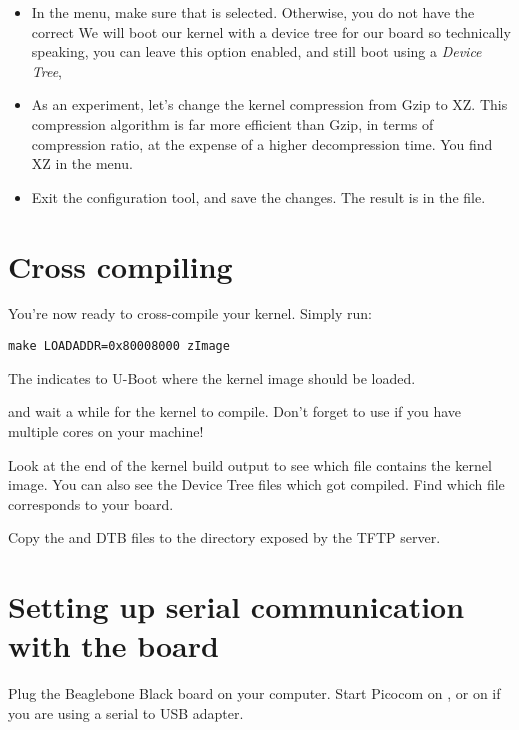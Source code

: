 \begin{itemize}

\item In the  menu, make sure that  is selected.
  Otherwise, you do not have the correct 
  We will boot our kernel with a device tree for our board so
  technically speaking, you can leave this option enabled,
  and still boot using a {\em Device Tree}, 

\item As an experiment, let's change the kernel compression from Gzip
  to XZ. This compression algorithm is far more efficient than Gzip,
  in terms of compression ratio, at the expense of a higher
  decompression time. You find XZ in the  menu.

\item Exit the configuration tool, and save the changes.  The result
  is in the  file.

\end{itemize}
\clearpage
\section{Cross compiling}

You're now ready to cross-compile your kernel. Simply run:

\begin{verbatim}
make LOADADDR=0x80008000 zImage
\end{verbatim}

The  indicates to U-Boot where the kernel image should
be loaded.

and wait a while for the kernel to compile. Don't forget to use
 if you have multiple cores on your machine!

Look at the end of the kernel build output to see which file contains
the kernel image. You can also see the Device Tree  files
which got compiled. Find which  file corresponds to your
board.

Copy the  and DTB files to the directory exposed by the TFTP server.

\section{Setting up serial communication with the board}

Plug the Beaglebone Black board on your computer. Start Picocom on
, or on  if you are using a serial
to USB adapter.

